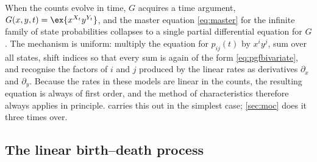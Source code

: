 When the counts evolve in time, $G$ acquires a time argument,
$G(x,y,t) = \ex{x^{X_t}y^{Y_t}}$, and the master equation \cref{eq:master} for the
infinite family of state probabilities collapses to a single partial differential
equation for $G$. The mechanism is uniform: multiply the equation for
$p_{ij}(t)$ by $x^iy^j$, sum over all states, shift indices so that every sum is
again of the form \cref{eq:pgfbivariate}, and recognise the factors of $i$ and $j$
produced by the linear rates as derivatives $\partial_x$ and $\partial_y$. Because
the rates in these models are linear in the counts, the resulting equation is
always of first order, and the method of characteristics therefore always applies
in principle.  carries this out in the simplest case;
\cref{sec:moc} does it three times over.

\subsection{The linear birth--death process}
\label{sec:linbd}

